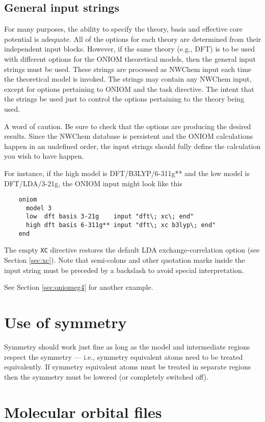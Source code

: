 \subsection{General input strings}

For many purposes, the ability to specify the theory, basis and
effective core potential is adequate.  All of the options for each
theory are determined from their independent input blocks.  However,
if the same theory (e.g., DFT) is to be used with different options
for the ONIOM theoretical models, then the general input strings must
be used.  These strings are processed as NWChem input each time the
theoretical model is invoked.  The strings may contain any NWChem
input, except for options pertaining to ONIOM and the task directive.
The intent that the strings be used just to control the options
pertaining to the theory being used.

A word of caution.  Be sure to check that the options are producing
the desired results.  Since the NWChem database is persistent and the
ONIOM calculations happen in an undefined order, the input strings
should fully define the calculation you wish to have happen.

For instance, if the high model is DFT/B3LYP/6-311g** and the
low model is DFT/LDA/3-21g, the ONIOM input might look like this
\begin{verbatim}
    oniom
      model 3
      low  dft basis 3-21g    input "dft\; xc\; end"
      high dft basis 6-311g** input "dft\; xc b3lyp\; end"
    end
\end{verbatim}
The empty \verb+XC+ directive restores the default LDA
exchange-correlation option (see Section \ref{sec:xc}).  Note that
semi-colons and other quotation marks inside the input string must be
preceded by a backslash to avoid special interpretation.

See Section \ref{sec:oniomeg4} for another example.

\section{Use of symmetry}

Symmetry should work just fine as long as the model and intermediate
regions respect the symmetry --- i.e., symmetry equivalent atoms need
to be treated equivalently.  If symmetry equivalent atoms must be
treated in separate regions then the symmetry must be lowered (or
completely switched off).  

\section{Molecular orbital files}

